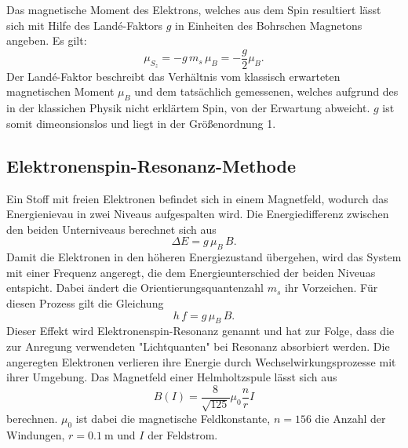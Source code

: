 Das magnetische Moment des Elektrons, welches aus dem Spin resultiert lässt sich mit Hilfe des Landé-Faktors $g$ in Einheiten des Bohrschen Magnetons angeben. Es gilt:
\begin{equation}
  \mu_{S_z} = -g\,m_s\,\mu_B = -\frac{g}{2}\mu_B.
\end{equation}
Der Landé-Faktor beschreibt das Verhältnis vom klassisch erwarteten magnetischen Moment $\mu_B$ und dem tatsächlich gemessenen, welches aufgrund des in der klassichen Physik nicht erklärtem Spin, von der Erwartung abweicht. $g$ ist somit dimeonsionslos und liegt in der Größenordnung 1.

\subsection{Elektronenspin-Resonanz-Methode}
Ein Stoff mit freien Elektronen befindet sich in einem Magnetfeld, wodurch das Energienievau in zwei Niveaus aufgespalten wird. Die Energiedifferenz zwischen den beiden Unterniveaus berechnet sich aus
\begin{equation}
  \Delta E = g\,\mu_B\,B.
\end{equation}
Damit die Elektronen in den höheren Energiezustand übergehen, wird das System mit einer Frequenz angeregt, die dem Energieunterschied der beiden Niveuas entspicht. Dabei ändert die Orientierungsquantenzahl $m_s$ ihr Vorzeichen. Für diesen Prozess gilt die Gleichung
\begin{equation}
\label{eqn:g}
  h\,f=g\,\mu_B\,B.
\end{equation}
Dieser Effekt wird Elektronenspin-Resonanz genannt und hat zur Folge, dass die zur Anregung verwendeten "Lichtquanten" bei Resonanz absorbiert werden. Die angeregten Elektronen verlieren ihre Energie durch Wechselwirkungsprozesse mit ihrer Umgebung.
Das Magnetfeld einer Helmholtzspule lässt sich aus
\begin{equation}
\label{eqn:spule}
  B(I)=\frac{8}{\sqrt{125}}\mu_0\frac{n}{r}I
\end{equation}
berechnen. $\mu_0$ ist dabei die magnetische Feldkonstante, $n=156$ die Anzahl der Windungen, $r=\SI{0,1}{\meter}$ und $I$ der Feldstrom.
